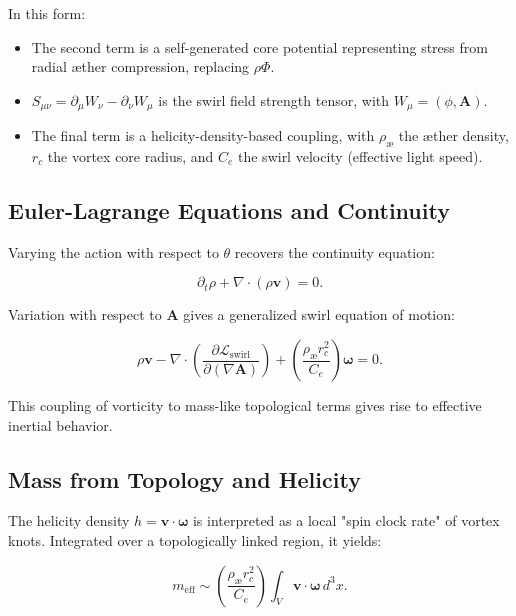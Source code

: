 In this form:
\begin{itemize}
    \item The second term is a self-generated core potential representing stress from radial æther compression, replacing $\rho \Phi$.
    \item $S_{\mu\nu} = \partial_\mu W_\nu - \partial_\nu W_\mu$ is the swirl field strength tensor, with $W_\mu = (\phi, \mathbf{A})$.
    \item The final term is a helicity-density-based coupling, with $\rho_{\text{æ}}$ the æther density, $r_c$ the vortex core radius, and $C_e$ the swirl velocity (effective light speed).
\end{itemize}

\subsection{Euler-Lagrange Equations and Continuity}

Varying the action with respect to $\theta$ recovers the continuity equation:

\begin{equation}
\partial_t \rho + \nabla \cdot (\rho \mathbf{v}) = 0.
\end{equation}

Variation with respect to $\mathbf{A}$ gives a generalized swirl equation of motion:

\begin{equation}
\rho \mathbf{v} - \nabla \cdot \left( \frac{\partial \mathcal{L}_{\text{swirl}}}{\partial (\nabla \mathbf{A})} \right) + \left( \frac{\rho_{\text{æ}} r_c^2}{C_e} \right) \boldsymbol{\omega} = 0.
\end{equation}

This coupling of vorticity to mass-like topological terms gives rise to effective inertial behavior.

\subsection{Mass from Topology and Helicity}

The helicity density $h = \mathbf{v} \cdot \boldsymbol{\omega}$ is interpreted as a local "spin clock rate" of vortex knots. Integrated over a topologically linked region, it yields:

\begin{equation}
m_{\text{eff}} \sim \left( \frac{\rho_{\text{æ}} r_c^2}{C_e} \right) \int_V \mathbf{v} \cdot \boldsymbol{\omega} \, d^3x.
\end{equation}

